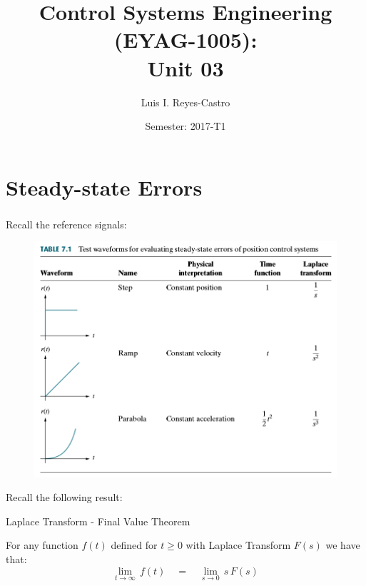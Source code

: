 \documentclass[ 10pt, xcolor = dvipsnames]{beamer}
\title[\shorttitle]{Control Systems Engineering (EYAG-1005): \\ \textbf{Unit 03} }
\author[L. I. Reyes-Castro]{Luis I. Reyes-Castro}
\institute[ESPOL]{\normalsize Escuela Superior Polit\'ecnica del Litoral (ESPOL) \\ Guayaquil - Ecuador}
\date[2017-T1]{Semester: 2017-T1}
\newcommand{\theoremblock}[2]{
\begin{center}
\begin{minipage}{0.9\columnwidth}
\begin{block}{#1}
#2
\end{block}
\end{minipage}
\end{center}
}
\begin{document}






\section{Steady-state Errors}

\begin{frame}[allowframebreaks]
\frametitle{\insertsection}

Recall the reference signals: 
\begin{figure}
\centering
\includegraphics[width=0.72\columnwidth]{figures/Nise_Table-7-1.jpg}
\end{figure}
\framebreak

Recall the following result: 

\theoremblock{Laplace Transform - Final Value Theorem}{
For any function $f(t)$ defined for $t \geq 0$ with Laplace Transform $F(s)$ \linebreak we have that: 
\[
\lim_{ t \rightarrow \infty } \, f(t) \quad = \quad
\lim_{ s \rightarrow 0 } \, s \, F(s)
\]
\halfskip
}

\end{frame}
\end{document}
